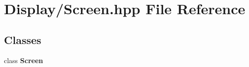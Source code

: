 \section{Display/\-Screen.hpp File Reference}
\label{_screen_8hpp}
\subsection*{Classes}
\begin{DoxyCompactItemize}
\item 
class {\bf Screen}
\end{DoxyCompactItemize}
